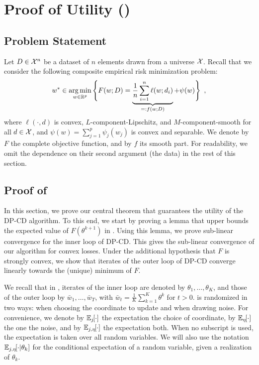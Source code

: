 


\section{Proof of Utility ()}
\label{sec-app:proof-utility}

\subsection{Problem Statement}
\label{sec:problem-statement}

Let $D \in \mathcal X^n$ be a dataset of $n$ elements drawn from a universe $\mathcal X$.
Recall that we consider the following composite empirical risk minimization
problem:
\begin{align}
  \label{eq:comp_erm_supp}
  w^* \in
  \operatorname*{arg\,min}_{w \in \mathbb{R}^p}
  \Bigg\{
  F(w; D) =
  \underbrace{\frac{1}{n} \sum_{i=1}^n \ell(w; d_i)}_{=: f(w; D)} + \psi(w)
  \Bigg\}\enspace,
\end{align}
where $\ell(\cdot, d)$ is convex, $L$-component-Lipschitz, and $M$-component-smooth
for all $d \in \mathcal X$, and $\psi(w) = \sum_{j=1}^p \psi_j(w_j)$ is convex and
separable.
We denote by $F$ the complete objective function, and by $f$ its smooth part.
For readability, we omit the dependence on their second argument (\ie the
data) in the rest of this section.


\subsection{Proof of }
\label{sec:proof-thm-utility}

In this section, we prove our central theorem that guarantees the utility of
the DP-CD algorithm.
To this end, we start by proving a lemma that upper bounds the expected value
of $F(\theta^{k+1})$ in .
Using this lemma, we prove sub-linear convergence for the inner loop of DP-CD.
This gives the sub-linear convergence of our algorithm for convex losses.
Under the additional hypothesis that $F$ is strongly convex, we show that
iterates of the outer loop of DP-CD converge linearly towards the (unique)
minimum of
$F$.

We recall that in , iterates of the inner loop are denoted by
$\theta_1, \dots, \theta_K$, and those of the outer loop by $\bar w_1, \dots,
  \bar w_T$, with $\bar w_t = \frac{1}{K} \sum_{k=1}^K \theta^k$ for $t > 0$.
 is randomized in two ways: when choosing the coordinate to
update and when drawing noise.
For convenience, we denote by $\mathbb E_{j} \hspace{-0.29em} \left[ \cdot \right]$ the expectation \wrt the
choice of coordinate,
by $\mathbb E_{\eta} \hspace{-0.29em} \left[ \cdot \right]$ the one \wrt the noise, and by $\mathbb E_{j,\eta} \hspace{-0.29em} \left[ \cdot \right]$
the expectation \wrt both.
When no subscript is used, the expectation is taken over all random
variables.
We will also use the notation $\mathbb E_{j,\eta} \hspace{-0.29em} \left[ \cdot \middle\vert \theta_k \right]$ for the
conditional expectation of a random variable, given a realization of
$\theta_k$.


